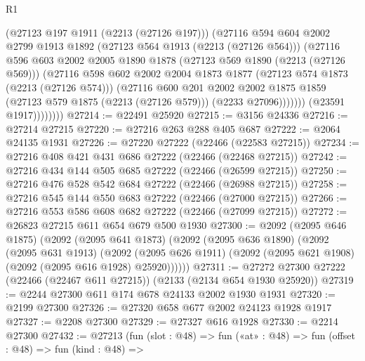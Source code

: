 \begin{lexlean}{R1}
\begin{coremodule}
                      (@27123 @197 @1911 (@2213 (@27126 @197)))
                      (@27116
                        @594
                        @604
                        @2002
                        @2799
                        @1913
                        @1892
                        (@27123 @564 @1913 (@2213 (@27126 @564)))
                        (@27116
                          @596
                          @603
                          @2002
                          @2005
                          @1890
                          @1878
                          (@27123 @569 @1890 (@2213 (@27126 @569)))
                          (@27116
                            @598
                            @602
                            @2002
                            @2004
                            @1873
                            @1877
                            (@27123 @574 @1873 (@2213 (@27126 @574)))
                            (@27116
                              @600
                              @201
                              @2002
                              @2002
                              @1875
                              @1859
                              (@27123 @579 @1875 (@2213 (@27126 @579)))
                              (@2233 @27096)))))))
                  (@23591 @1917))))))))
@27214 := @22491 @25920
@27215 := @3156 @24336
@27216 := @27214 @27215
@27220 := @27216 @263 @288 @405 @687
@27222 := @2064 @24135 @1931
@27226 := @27220 @27222 (@22466 (@22583 @27215))
@27234 := @27216 @408 @421 @431 @686 @27222 (@22466 (@22468 @27215))
@27242 := @27216 @434 @144 @505 @685 @27222 (@22466 (@26599 @27215))
@27250 := @27216 @476 @528 @542 @684 @27222 (@22466 (@26988 @27215))
@27258 := @27216 @545 @144 @550 @683 @27222 (@22466 (@27000 @27215))
@27266 := @27216 @553 @586 @608 @682 @27222 (@22466 (@27099 @27215))
@27272 := @26823 @27215 @611 @654 @679 @500 @1930
@27300 := @2092
    (@2095 @646 @1875)
    (@2092
      (@2095 @641 @1873)
      (@2092
        (@2095 @636 @1890)
        (@2092
          (@2095 @631 @1913)
          (@2092 (@2095 @626 @1911) (@2092 (@2095 @621 @1908) (@2092 (@2095 @616 @1928) @25920))))))
@27311 := @27272 @27300 @27222 (@22466 (@22467 @611 @27215)) (@2133 (@2134 @654 @1930 @25920))
@27319 := @2244 @27300 @611 @174 @678 @24133 @2002 @1930 @1931
@27320 := @2199 @27300
@27326 := @27320 @658 @677 @2002 @24123 @1928 @1917
@27327 := @2208 @27300
@27329 := @27327 @616 @1928
@27330 := @2214 @27300
@27432 := @27213
    (fun (slot : @48) =>
    fun («at» : @48) =>
    fun (offset : @48) =>
    fun (kind : @48) =>

\end{coremodule}
\end{lexlean}
